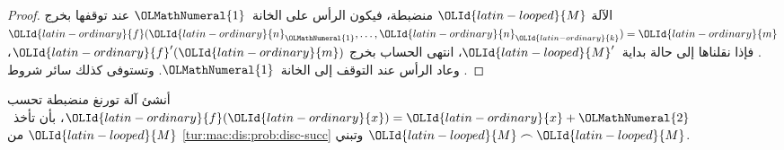 \documentclass[../../../include/open-logic-section]{subfiles}
\begin{document}
\begin{proof}
الآلة $\OLId{latin-looped}{M}$ منضبطة، فيكون الرأس على الخانة~$\OLMathNumeral{1}$ عند توقفها بخرج $\OLId{latin-ordinary}{f}(\OLId{latin-ordinary}{n}_\OLMathNumeral{1},\dots,\OLId{latin-ordinary}{n}_\OLId{latin-ordinary}{k})=\OLId{latin-ordinary}{m}$. فإذا نقلناها إلى حالة بداية~$\OLId{latin-looped}{M}'$، انتهى الحساب بخرج $\OLId{latin-ordinary}{f}'(\OLId{latin-ordinary}{m})$، وعاد الرأس عند التوقف إلى الخانة~$\OLMathNumeral{1}$. وتستوفى كذلك سائر شروط .
\end{proof}

\begin{prob}
أنشئ آلة تورنغ منضبطة تحسب $\OLId{latin-ordinary}{f}(\OLId{latin-ordinary}{x})=\OLId{latin-ordinary}{x}+\OLMathNumeral{2}$، بأن تأخذ~$\OLId{latin-looped}{M}$ من \cref{tur:mac:dis:prob:disc-succ} وتبني $\OLId{latin-looped}{M}\frown \OLId{latin-looped}{M}$.
\end{prob}
\end{document}

